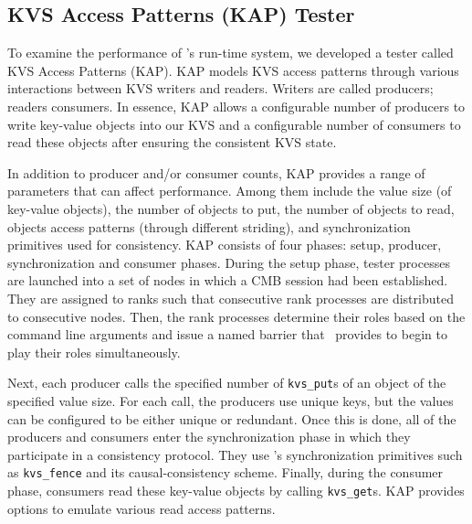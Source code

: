 \subsection{KVS Access Patterns (KAP) Tester}
To examine the performance of \flux's run-time system,
we developed a tester called KVS Access Patterns (KAP).
KAP models KVS access patterns through various interactions
between KVS writers and readers. Writers are called producers;
readers consumers.
In essence, KAP allows a configurable number of producers
to write key-value objects into our KVS 
and a configurable number of consumers to read these
objects after ensuring the consistent KVS state.

In addition to producer and/or consumer counts,
KAP provides a range of parameters that can affect performance.
Among them include the value size (of key-value objects),
the number of objects to put,
the number of objects to read, objects access 
patterns (through different striding), and
synchronization primitives used for consistency.
KAP consists of four phases: setup, producer, synchronization 
and consumer phases. 
During the setup phase, tester processes are launched 
into a set of nodes in which a CMB session had been established.
They are assigned to ranks such that consecutive rank
processes are distributed to consecutive nodes.
Then, the rank processes determine their roles based
on the command line arguments and issue a named barrier
that \flux\ provides to begin to play their roles
simultaneously.

Next, each producer calls the specified number of
{\tt kvs\_put}s of an object of the specified value size.
For each call, the producers use unique keys, but
the values can be configured to be either unique
or redundant.
Once this is done, all of the producers and consumers
enter the synchronization phase in which they 
participate in a consistency protocol. They use
\flux's synchronization primitives such as {\tt kvs\_fence}
and its causal-consistency scheme.
Finally, during the consumer phase, consumers read
these key-value objects by calling {\tt kvs\_get}s.
KAP provides options to emulate various read access
patterns.

